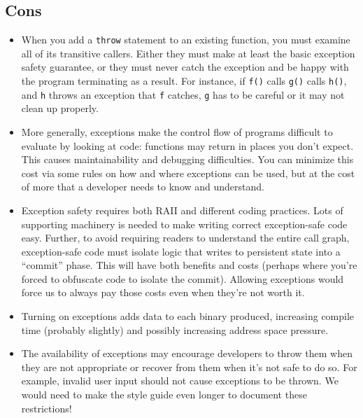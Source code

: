 \subsection{Cons}
\begin{itemize}
    \item When you add a \texttt{throw} statement to an existing function, you must examine all of its transitive callers. Either they must make at least the basic exception safety guarantee, or they must never catch the exception and be happy with the program terminating as a result. For instance, if \texttt{f()} calls \texttt{g()} calls \texttt{h()}, and \texttt{h} throws an exception that \texttt{f} catches, \texttt{g} has to be careful or it may not clean up properly.
    \item More generally, exceptions make the control flow of programs difficult to evaluate by looking at code: functions may return in places you don't expect. This causes maintainability and debugging difficulties. You can minimize this cost via some rules on how and where exceptions can be used, but at the cost of more that a developer needs to know and understand.
    \item Exception safety requires both RAII and different coding practices. Lots of supporting machinery is needed to make writing correct exception-safe code easy. Further, to avoid requiring readers to understand the entire call graph, exception-safe code must isolate logic that writes to persistent state into a \enquote{commit} phase. This will have both benefits and costs (perhaps where you're forced to obfuscate code to isolate the commit). Allowing exceptions would force us to always pay those costs even when they're not worth it.
    \item Turning on exceptions adds data to each binary produced, increasing compile time (probably slightly) and possibly increasing address space pressure.
    \item The availability of exceptions may encourage developers to throw them when they are not appropriate or recover from them when it's not safe to do so. For example, invalid user input should not cause exceptions to be thrown. We would need to make the style guide even longer to document these restrictions!
\end{itemize}

